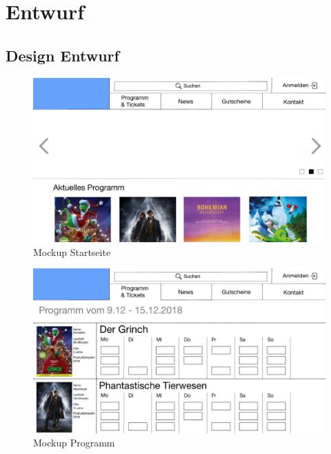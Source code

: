 \chapter{Entwurf}\label{entwurf}
	\section{Design Entwurf}	
		\begin{figure}[H]
			\centering 
			\includegraphics[width=14cm]{img/mockUp1.png}
			\captionsetup{format=hang}
			\caption[Mockup Startseite]{\label{fig:mockUpStartseite} Mockup Startseite }
		\end{figure}
		\begin{figure}[H]
			\centering 
			\includegraphics[width=14cm]{img/mockUp2.png}
			\captionsetup{format=hang}
			\caption[Mockup Programm]{\label{fig:mockUpProgramm} Mockup Programm }
		\end{figure}
